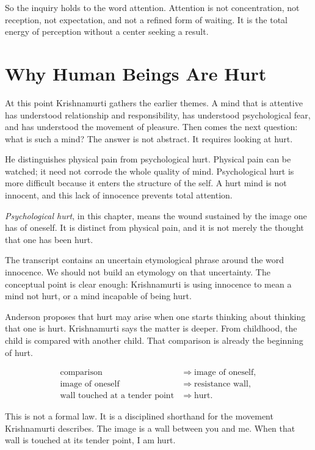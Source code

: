So the inquiry holds to the word attention. Attention is not concentration, not reception, not expectation, and not a refined form of waiting. It is the total energy of perception without a center seeking a result.

\section{Why Human Beings Are Hurt}

At this point Krishnamurti gathers the earlier themes. A mind that is attentive has understood relationship and responsibility, has understood psychological fear, and has understood the movement of pleasure. Then comes the next question: what is such a mind? The answer is not abstract. It requires looking at hurt.

He distinguishes physical pain from psychological hurt. Physical pain can be watched; it need not corrode the whole quality of mind. Psychological hurt is more difficult because it enters the structure of the self. A hurt mind is not innocent, and this lack of innocence prevents total attention.

\begin{definition}
\emph{Psychological hurt}, in this chapter, means the wound sustained by the image one has of oneself. It is distinct from physical pain, and it is not merely the thought that one has been hurt.
\end{definition}

The transcript contains an uncertain etymological phrase around the word innocence. We should not build an etymology on that uncertainty. The conceptual point is clear enough: Krishnamurti is using innocence to mean a mind not hurt, or a mind incapable of being hurt.

Anderson proposes that hurt may arise when one starts thinking about thinking that one is hurt. Krishnamurti says the matter is deeper. From childhood, the child is compared with another child. That comparison is already the beginning of hurt.

\begin{align}
\text{comparison}
&\Rightarrow \text{image of oneself},\\
\text{image of oneself}
&\Rightarrow \text{resistance wall},\\
\text{wall touched at a tender point}
&\Rightarrow \text{hurt}.
\end{align}

This is not a formal law. It is a disciplined shorthand for the movement Krishnamurti describes. The image is a wall between you and me. When that wall is touched at its tender point, I am hurt.

